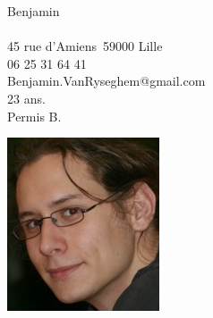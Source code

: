 \documentclass{curve}
\title{}
\begin{document}
\begin{minipage}{7cm}
Benjamin \\
\\
45 rue d'Amiens\
59000 Lille\\
06 25 31 64 41\\
Benjamin.VanRyseghem@gmail.com\\
23 ans.\\
Permis B.
\end{minipage}
\hfill
\begin{minipage}{5cm}
  \begin{flushright}
  \includegraphics[height=20ex]{Moi}
  \end{flushright}
\end{minipage}
\vspace{-0.5cm}
\maketitle
\vspace{-1cm}
\end{document}
